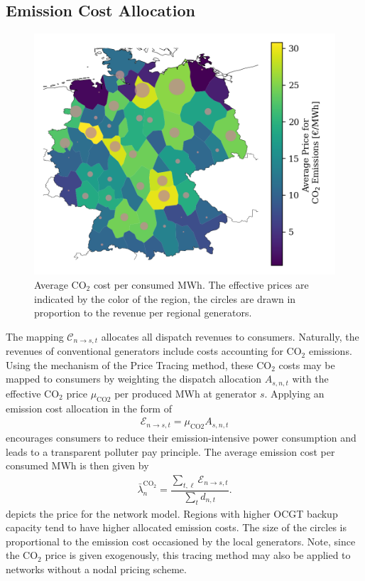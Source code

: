 \documentclass[11pt,twocolumn]{article}
\newcommand{\averagelmp}[1][n]{\bar{\lambda}_{#1}}
\newcommand{\demand}[1][n]{d_{#1,t}}
\newcommand{\emissionprice}{\mu_{\text{CO2}}}
\newcommand{\cost}{\mathcal{C}}
\newcommand{\emissioncost}{\mathcal{E}}
\newcommand{\allocategeneration}[1][s, n]{A_{#1,t}}
\newcommand{\allocategeneratorcost}[1][n \rightarrow s]{\cost_{#1, t}}
\newcommand{\allocateemissioncost}[1][n \rightarrow s]{\emissioncost_{#1,t}}
\begin{document}
\subsection{Emission Cost Allocation}
\label{sec:co2-cost-allocation}

\begin{figure}[h!]
    \includegraphics[width=\linewidth]{de50/maps_price/co2_cost.png}
    \caption{Average CO$_2$ cost per consumed MWh. The effective prices are indicated by the color of the region, the circles are drawn in proportion to the revenue per regional generators.}
    \label{fig:opex_price}
\end{figure}

The mapping $\allocategeneratorcost$ allocates all dispatch revenues to consumers. Naturally, the revenues of conventional generators include costs accounting for CO$_2$ emissions. Using the mechanism of the Price Tracing method, these CO$_2$ costs may be mapped to consumers by weighting the dispatch allocation $\allocategeneration$ with the effective CO$_2$ price $\emissionprice$ per produced MWh at generator $s$. Applying an emission cost allocation in the form of
\begin{align}
    \allocateemissioncost = \emissionprice \allocategeneration
\end{align}
encourages consumers to reduce their emission-intensive power consumption and leads to a transparent polluter pay principle. The average emission cost per consumed MWh is then given by
\begin{align}
    \averagelmp^{\text{CO}_2} = \dfrac{\sum_{t,\ell} \allocateemissioncost}{\sum_t \demand}.
\end{align}
 depicts the price for the network model. Regions with higher \ac{OCGT} backup capacity tend to have higher allocated emission costs. The size of the circles is proportional to the emission cost occasioned by the local generators.
Note, since the CO$_2$ price is given exogenously, this tracing method may also be applied to networks without a nodal pricing scheme.
\end{document}
